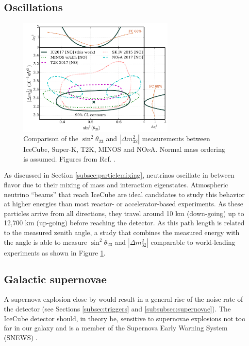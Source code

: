 \subsection{Oscillations}
\begin{figure}[t]
\centering
\includegraphics[width=0.7\textwidth]{chapter5/img/oscillations.png}
\caption{Comparison of the $\sin^2 \theta_{23}$ and $\left| \Delta m^2_{32}\right|$ measurements between IceCube, Super-K, T2K, MINOS and NO$\nu$A. Normal mass ordering is assumed. Figures from Ref. \cite{Aartsen:2017nmd}.}
\label{fig:oscillations}
\end{figure}

As discussed in Section \ref{subsec:particlemixing}, neutrinos oscillate in between flavor due to their mixing of mass and interaction eigenstates. Atmospheric neutrino ``beams'' that reach IceCube are ideal candidates to study this behavior at higher energies than most reactor- or accelerator-based experiments. As these particles arrive from all directions, they travel around 10 km (down-going) up to 12,700 km (up-going) before reaching the detector. As this path length is related to the measured zenith angle, a study that combines the measured energy with the angle is able to measure $\sin^2 \theta_{23}$ and $\left| \Delta m^2_{32}\right|$ comparable to world-leading experiments as shown in Figure \ref{fig:oscillations}. 

\subsection{Galactic supernovae}
A supernova explosion close by would result in a general rise of the noise rate of the detector (see Sections \ref{subsec:triggers} and \ref{subsubsec:supernovae}). The IceCube detector should, in theory be, sensitive to supernovae explosions not too far in our galaxy \cite{Baum:2017rty} and is a member of the Supernova Early Warning System (SNEWS) \cite{Kowarik:2009qr}.
\fi


